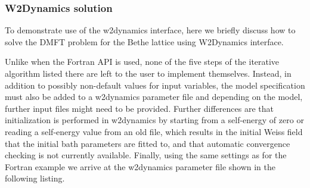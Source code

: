 \documentclass[edipack2.tex]{subfiles}
\begin{document}
\subsubsection{W2Dynamics solution}\label{SecExamplesBetheDMFTw2d}
To demonstrate use of the w2dynamics interface, here we briefly
discuss how to solve the DMFT problem for the Bethe lattice using
W2Dynamics interface. 

Unlike when the Fortran API is used, none of the
five steps of the iterative algorithm listed there are left to the
user to implement themselves. Instead, in addition to possibly
non-default values for \NAME input variables, the model specification
must also be added to a w2dynamics parameter file and depending on the
model, further input files might need to be provided. Further
differences are that initialization is performed in w2dynamics by
starting from a self-energy of zero or reading a self-energy value
from an old file, which results in the initial Weiss field that the
initial bath parameters are fitted to, and that automatic convergence
checking is not currently available. Finally, using the same settings
as for the Fortran example we arrive at the w2dynamics parameter file
shown in the following listing.
\end{document}
